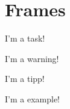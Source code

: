 \chapter{Frames}

\startframedtask
I'm a task!
\stopframedtask

\startframedwarning
I'm a warning!
\stopframedwarning

\startframedtipp
I'm a tipp!
\stopframedtipp

\startframedexample
I'm a example!
\stopframedexample
